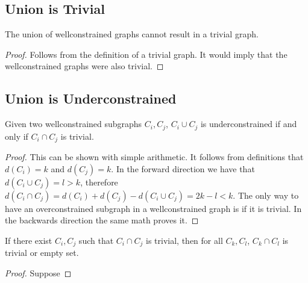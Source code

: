 \documentclass[11pt]{article}
\begin{document}


\subsection{Union is Trivial}
\begin{lemma}
The union of wellconstrained graphs cannot result in a trivial graph.
\end{lemma}

\begin{proof}

Follows from the definition of a trivial graph. It would imply that the wellconstrained graphs were also trivial.
\end{proof}


\subsection{Union is Underconstrained}
\begin{lemma}\label{uc-l1}
Given two wellconstrained subgraphs $C_i,C_j$, $C_i\cup C_j$ is underconstrained if and only if $C_i\cap C_j$ is trivial.
\end{lemma}

\begin{proof}
This can be shown with simple arithmetic. It follows from definitions that $d(C_i)=k$ and $d(C_j)=k$. In the forward direction we have that $d(C_i\cup C_j)=l>k$, therefore $d(C_i\cap C_j)=d(C_i)+d(C_j)-d(C_i\cup C_j)=2k-l<k$. The only way to have an overconstrained subgraph in a wellconstrained graph is if it is trivial. In the backwards direction the same math proves it.
\end{proof}

\begin{lemma}
If there exist $C_i, C_j$ such that $C_i\cap C_j$ is trivial, then for all $C_k,C_l$, $C_k\cap C_l$ is trivial or empty set.
\end{lemma}

\begin{proof}
Suppose
\end{proof}
\end{document}
